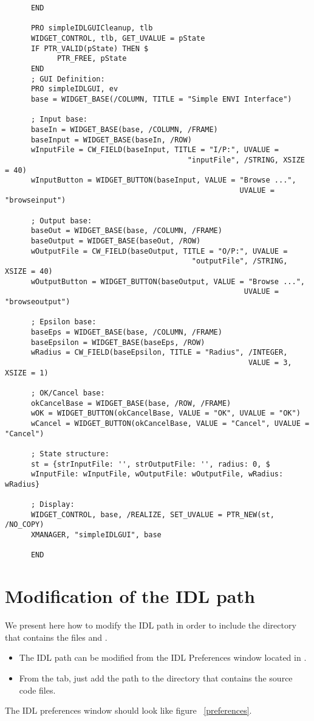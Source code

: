 \begin{verbatim}
      END

      PRO simpleIDLGUICleanup, tlb
      WIDGET_CONTROL, tlb, GET_UVALUE = pState
      IF PTR_VALID(pState) THEN $
            PTR_FREE, pState
      END
      ; GUI Definition:
      PRO simpleIDLGUI, ev
      base = WIDGET_BASE(/COLUMN, TITLE = "Simple ENVI Interface")

      ; Input base:
      baseIn = WIDGET_BASE(base, /COLUMN, /FRAME)
      baseInput = WIDGET_BASE(baseIn, /ROW)
      wInputFile = CW_FIELD(baseInput, TITLE = "I/P:", UVALUE =
                                          "inputFile", /STRING, XSIZE = 40)
      wInputButton = WIDGET_BUTTON(baseInput, VALUE = "Browse ...",
                                                      UVALUE = "browseinput")

      ; Output base:
      baseOut = WIDGET_BASE(base, /COLUMN, /FRAME)
      baseOutput = WIDGET_BASE(baseOut, /ROW)
      wOutputFile = CW_FIELD(baseOutput, TITLE = "O/P:", UVALUE =
                                           "outputFile", /STRING, XSIZE = 40)
      wOutputButton = WIDGET_BUTTON(baseOutput, VALUE = "Browse ...",
                                                       UVALUE = "browseoutput")

      ; Epsilon base:
      baseEps = WIDGET_BASE(base, /COLUMN, /FRAME)
      baseEpsilon = WIDGET_BASE(baseEps, /ROW)
      wRadius = CW_FIELD(baseEpsilon, TITLE = "Radius", /INTEGER,
                                                        VALUE = 3, XSIZE = 1)

      ; OK/Cancel base:
      okCancelBase = WIDGET_BASE(base, /ROW, /FRAME)
      wOK = WIDGET_BUTTON(okCancelBase, VALUE = "OK", UVALUE = "OK")
      wCancel = WIDGET_BUTTON(okCancelBase, VALUE = "Cancel", UVALUE = "Cancel")

      ; State structure:
      st = {strInputFile: '', strOutputFile: '', radius: 0, $
      wInputFile: wInputFile, wOutputFile: wOutputFile, wRadius: wRadius}

      ; Display:
      WIDGET_CONTROL, base, /REALIZE, SET_UVALUE = PTR_NEW(st, /NO_COPY)
      XMANAGER, "simpleIDLGUI", base

      END
\end{verbatim}

\section{Modification of the IDL path} 

We present here how to modify the IDL path in order to include the directory that contains the files  and .
\begin{itemize}
    \item The IDL path can be modified from the IDL Preferences window located in . 
    \item From the  tab, just add the path to the directory that contains the source code files.
\end{itemize}
The IDL preferences window should look like figure ~\ref{preferences}.

